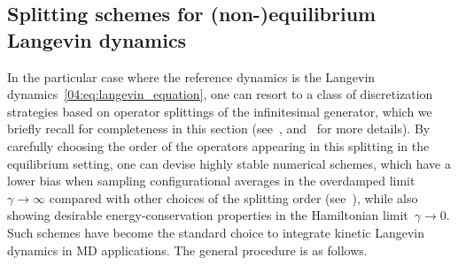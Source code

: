 \subsection{Splitting schemes for (non-)equilibrium Langevin dynamics}\label{04:subsec:discr_nemd}
In the particular case where the reference dynamics is the Langevin dynamics~\eqref{04:eq:langevin_equation}, one can resort to a class of discretization strategies based on operator splittings of the infinitesimal generator, which we briefly recall for completeness in this section (see~\cite{LM13a,LMS16},  and~\cite[Chapter 7]{LM15} for more details).
By carefully choosing the order of the operators appearing in this splitting in the equilibrium setting, one can devise highly stable numerical schemes, which have a lower bias when sampling configurational averages in the overdamped limit~$\gamma\to\infty$ compared with other choices of the splitting order (see~\cite{LM13b}), while also showing desirable energy-conservation properties in the Hamiltonian limit~$\gamma\to 0$. Such schemes have become the standard choice to integrate kinetic Langevin dynamics in MD applications. The general procedure is as follows.


